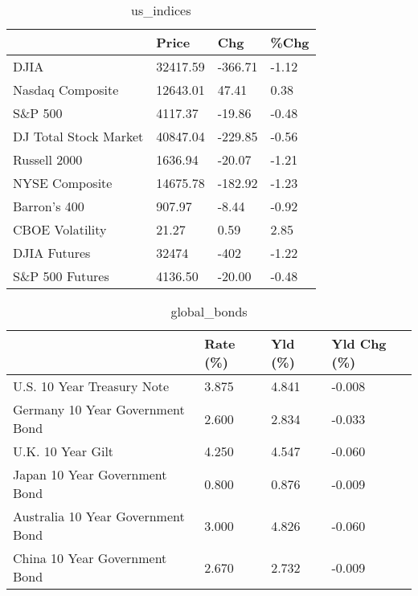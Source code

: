 \documentclass{article}%
\begin{document}
%


\begin{table}[htbp]%
\caption{us\_indices}%
\centering%
\begin{adjustbox}{width=1\textwidth}%
\begin{tabular}{llll}
\toprule
                      &    Price &     Chg &  \%Chg \\
\midrule
                 DJIA & 32417.59 & -366.71 & -1.12 \\
     Nasdaq Composite & 12643.01 &   47.41 &  0.38 \\
              S\&P 500 &  4117.37 &  -19.86 & -0.48 \\
DJ Total Stock Market & 40847.04 & -229.85 & -0.56 \\
         Russell 2000 &  1636.94 &  -20.07 & -1.21 \\
       NYSE Composite & 14675.78 & -182.92 & -1.23 \\
         Barron's 400 &   907.97 &   -8.44 & -0.92 \\
      CBOE Volatility &    21.27 &    0.59 &  2.85 \\
         DJIA Futures &    32474 &    -402 & -1.22 \\
      S\&P 500 Futures &  4136.50 &  -20.00 & -0.48 \\
\bottomrule
\end{tabular}
%
\end{adjustbox}%
\end{table}

%


\begin{table}[htbp]%
\caption{global\_bonds}%
\centering%
\begin{adjustbox}{width=1\textwidth}%
\begin{tabular}{llll}
\toprule
                                  & Rate (\%) & Yld (\%) & Yld Chg (\%) \\
\midrule
       U.S. 10 Year Treasury Note &    3.875 &   4.841 &      -0.008 \\
  Germany 10 Year Government Bond &    2.600 &   2.834 &      -0.033 \\
                U.K. 10 Year Gilt &    4.250 &   4.547 &      -0.060 \\
    Japan 10 Year Government Bond &    0.800 &   0.876 &      -0.009 \\
Australia 10 Year Government Bond &    3.000 &   4.826 &      -0.060 \\
    China 10 Year Government Bond &    2.670 &   2.732 &      -0.009 \\
\bottomrule
\end{tabular}
%
\end{adjustbox}%
\end{table}
\end{document}

